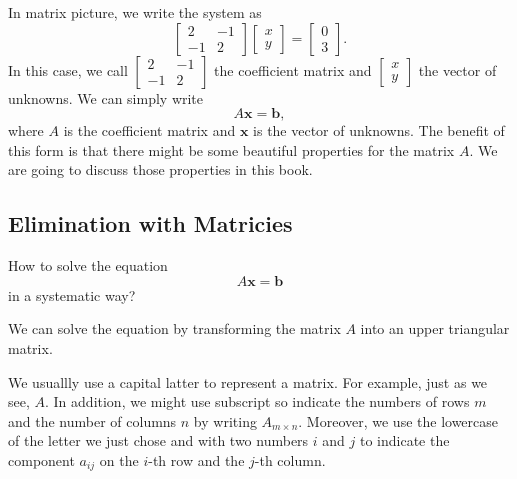 \documentclass[11pt]{article}
\theoremstyle{break}
\theoremstyle{no_label}
\newcommand{\bfb}{\textbf{b}}
\newcommand{\bfx}{\textbf{x}}
\numberwithin{equation}{section}
\begin{document}
In matrix picture, we write the system as
\begin{equation}\label{example equation in form of matrix}
    \begin{bmatrix}
        2 & -1 \\ -1 & 2
    \end{bmatrix}\begin{bmatrix}
        x \\ y
    \end{bmatrix}=\begin{bmatrix}
        0 \\ 3
    \end{bmatrix}.
\end{equation}
In this case, we call $\begin{bmatrix}
    2 & -1 \\ -1 & 2
\end{bmatrix}$ the coefficient matrix and $\begin{bmatrix}
    x \\ y
\end{bmatrix}$ the vector of unknowns. We can simply write \begin{equation*}
    A\bfx=\bfb,
\end{equation*}
where $A$ is the coefficient matrix and $\bfx$ is the vector of unknowns. The benefit of this form is that there might be some beautiful properties for the matrix $A$. We are going to discuss those properties in this book.

\subsection{Elimination with Matricies}

\begin{question}
    How to solve the equation \begin{equation*}
        A\bfx=\bfb
    \end{equation*}
    in a systematic way?
\end{question}

We can solve the equation by transforming the matrix $A$ into an upper triangular matrix.

\begin{notation}[Matrix]
    We usuallly use a capital latter to represent a matrix. For example, just as we see, $A$. In addition, we might use subscript so indicate the numbers of rows $m$ and the number of columns $n$ by writing $A_{m\times n}$. Moreover, we use the lowercase of the letter we just chose and with two numbers $i$ and $j$ to indicate the component $a_{ij}$ on the $i$-th row and the $j$-th column.
\end{notation}
\end{document}
